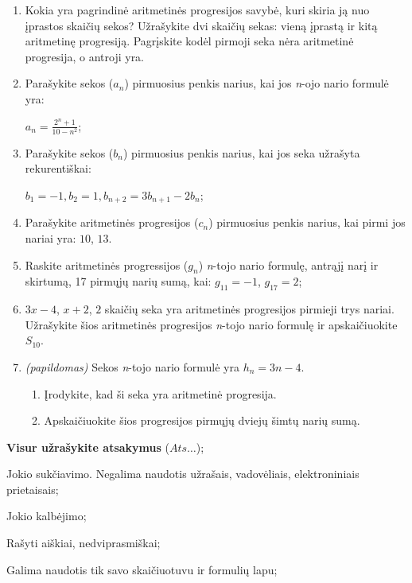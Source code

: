 \documentclass[a4paper]{article}
\begin{document}
\begin{enumerate}
      \item Kokia yra pagrindinė aritmetinės progresijos savybė, kuri skiria ją
            nuo įprastos skaičių sekos? Užrašykite dvi skaičių sekas: vieną
            įprastą ir kitą aritmetinę progresiją. Pagrįskite kodėl pirmoji
            seka nėra
            aritmetinė progresija, o antroji yra.

      \item Parašykite sekos ($a_{n}$) pirmuosius penkis
            narius, kai jos \textit{n}-ojo nario formulė yra:

            $a_{n}=\frac{2^{n} + 1}{10 - n^2}$;

      \item Parašykite sekos ($b_{n}$) pirmuosius penkis
            narius, kai jos seka užrašyta rekurentiškai:

            $b_1 = -1, b_{2} = 1, b_{n+2}=3b_{n+1}-2b_{n}$;

      \item Parašykite aritmetinės progresijos ($c_{n}$) pirmuosius penkis
            narius, kai pirmi jos nariai yra: $10$, $13$.

      \item Raskite aritmetinės progressijos ($g_{n}$) \textit{n}-tojo nario
            formulę, antrąjį narį ir
            skirtumą, 17 pirmųjų narių sumą, kai:
            $g_{11} = -1$, $g_{17}=2$;
      \item $ 3x -4 $, $x + 2$, $2$ skaičių seka yra aritmetinės progresijos
            pirmieji trys nariai. Užrašykite šios aritmetinės progresijos
            \textit{n}-tojo
            nario formulę ir apskaičiuokite $S_{10}$.

      \item \textit{(papildomas)} Sekos \textit{n}-tojo nario formulė yra $h_{n} = 3n-4$. 
      \begin{enumerate}[label= (\alph*)]
            \item Įrodykite, kad ši seka yra aritmetinė progresija.
            \item Apskaičiuokite šios progresijos pirmųjų dviejų šimtų narių sumą.
      \end{enumerate} 
\end{enumerate}

\begin{small}
      \begin{enumerate*}[label={(\arabic*)}]
            \item \textbf{Visur užrašykite atsakymus} ($Ats\ldots$);
            \item Jokio sukčiavimo. Negalima naudotis užrašais, vadovėliais,
            elektroniniais prietaisais;
            \item Jokio kalbėjimo;
            \item Rašyti aiškiai, nedviprasmiškai;
            \item Galima naudotis tik savo skaičiuotuvu ir formulių lapu;
      \end{enumerate*}
\end{small}
\end{document}
